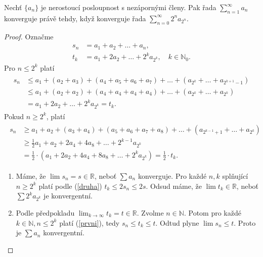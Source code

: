 \begin{veta} \label{veta7.9}
Nechť $\{a_n\}$ je nerostoucí posloupnost s nezápornými členy.
Pak řada
$
\sum_{n=1}^{\infty} a_n
$
konverguje právě tehdy, když konverguje řada
$
\sum_{n=0}^{\infty} 2^n a_{2^n}.
$
\end{veta}

\begin{proof}
Označme
\begin{align*}
s_n & = a_1+ a_2+ \dots+ a_n,\\
t_k &= a_1 + 2a_2 + \dots + 2^ka_{2^k}, \quad k \in \mathbb N _0.
\end{align*}
	Pro $n \leq 2^k$ platí
	\begin{align}\label{prvni}
	\begin{split}
	s_n &\leq a_1 + (a_2 + a_3) + (a_4 + a_5 + a_6 + a_7) + \dots + (a_{2^k}+ \dots + a_{2^{k+1}-1})\\
	& \leq a_1 + (a_2 + a_2) + (a_4 + a_4 + a_4 + a_4) + \dots + (a_{2^k}+ \dots + a_{2^k})\\
	&= a_1 + 2a_2 + \dots + 2^ka_{2^k} = t_k.
\end{split}
	\end{align}
	Pokud $n \geq 2^k$, platí
	\begin{align}\label{druha}
	\begin{split}
	s_n& \geq a_1 + a_2 + (a_3 + a_4) + (a_5+ a_6+a_7+a_8) + \dots + (a_{2^{k-1}+1}+\dots+a_{2^k})\\
	& \geq \frac{1}{2} a_1+ a_2 + 2 a_4+ 4a_8 + \dots + 2^{k-1} a_{2^k} \\
	&= \frac{1}{2} \cdot \left( a_1 + 2a_2 + 4a_4+8a_8+ \dots + 2^ka_{2^k} \right ) = \frac{1}{2} \cdot t_k.
\end{split}
\end{align}

\begin{enumerate}
	\item[$\implies$] Máme, že $\lim s_n = s\in \mathbb R $, neboť $\sum a_n$ konverguje. Pro každé
	$n, k$ splňující $n\geq 2^k$ platí podle (\ref{druha}) $t_k \leq 2s_n \leq 2s$. Odsud máme, že
	$\lim t_k \in \mathbb R$, neboť $\sum 2^k a_{2^k}$ je konvergentní.
	\item[$\impliedby$] Podle předpokladu $\lim_{k\to \infty}t_k = t\in \mathbb R $.
	Zvolme $n\in \mathbb N $. Potom pro každé $k\in \mathbb N, n \leq 2^k $ platí (\ref{prvni}),
	tedy $s_n \leq t_k \leq t$. Odtud plyne $\lim s_n \leq t$. Proto je $\sum a_n$ konvergentní. \qedhere
\end{enumerate}
\end{proof}

